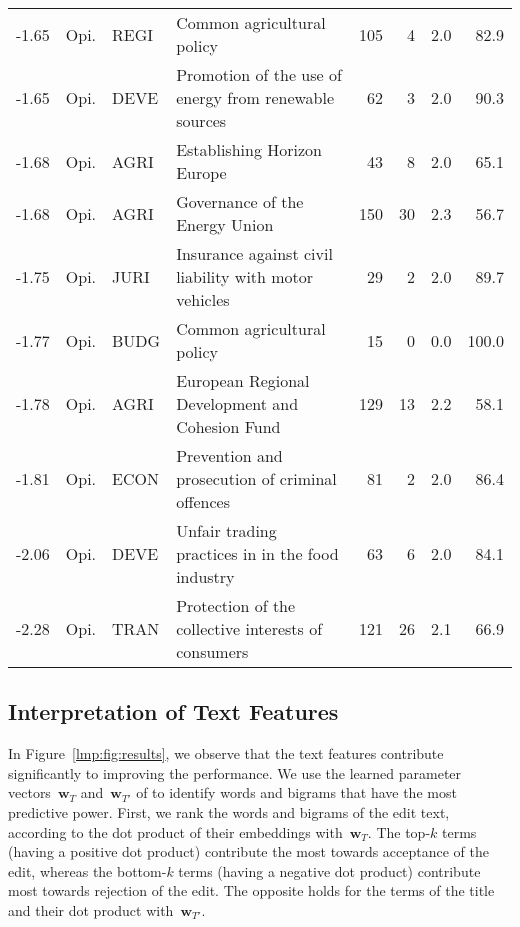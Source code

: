 \begin{sidewaystable}
\begin{tabular}{rlllrrrr}
		-1.65 & Opi. & REGI  & Common agricultural policy                                    & 105      & 4        & 2.0            & 82.9    \\
		-1.65 & Opi. & DEVE  & Promotion of the use of energy from renewable sources         & 62       & 3        & 2.0            & 90.3    \\
		-1.68 & Opi. & AGRI  & Establishing Horizon Europe                                   & 43       & 8        & 2.0            & 65.1    \\
		-1.68 & Opi. & AGRI  & Governance of the Energy Union                                & 150      & 30       & 2.3            & 56.7    \\
		-1.75 & Opi. & JURI  & Insurance against civil liability with motor vehicles         & 29       & 2        & 2.0            & 89.7    \\
		-1.77 & Opi. & BUDG  & Common agricultural policy                                    & 15       & 0        & 0.0            & 100.0   \\
		-1.78 & Opi. & AGRI  & European Regional Development and Cohesion Fund               & 129      & 13       & 2.2            & 58.1    \\
		-1.81 & Opi. & ECON  & Prevention and prosecution of criminal offences               & 81       & 2        & 2.0            & 86.4    \\
		-2.06 & Opi. & DEVE  & Unfair trading practices in in the food industry              & 63       & 6        & 2.0            & 84.1    \\
		-2.28 & Opi. & TRAN  & Protection of the collective interests of consumers           & 121      & 26       & 2.1            & 66.9    \\

		\bottomrule
	\end{tabular}
\end{sidewaystable}

\subsection{Interpretation of Text Features}
\label{lmp:sec:intertext}

In Figure~\ref{lmp:fig:results}, we observe that the text features contribute significantly to improving the performance.
We use the learned parameter vectors~$\boldsymbol{w}_T$ and~$\boldsymbol{w}_{T'}$ of  to identify words and bigrams that have the most predictive power.
First, we rank the words and bigrams of the edit text, according to the dot product of their embeddings with~$\boldsymbol{w}_T$.
The top-$k$ terms (having a positive dot product) contribute the most towards acceptance of the edit, whereas the bottom-$k$ terms (having a negative dot product) contribute most towards rejection of the edit.
The opposite holds for the terms of the title and their dot product with~$\boldsymbol{w}_{T'}$.

